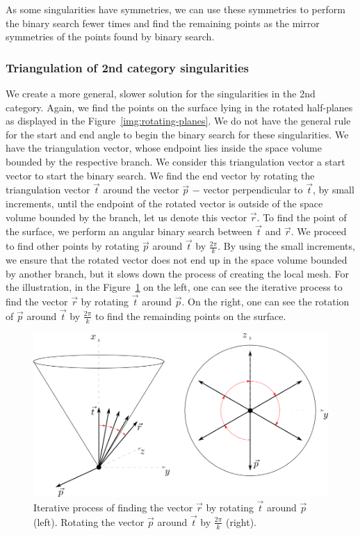 As some singularities have symmetries, we can use these symmetries
to perform the binary search fewer times and find the remaining points
as the mirror symmetries of the points found by binary search.

\subsubsection*{Triangulation of 2nd category singularities}
We create a more general, slower solution for the singularities in the 2nd category.
Again, we find the points on the surface lying in the rotated half-planes
as displayed in the Figure~\ref{img:rotating-planes}.
We do not have the general rule for the start 
and end angle to begin the binary search for these singularities. We have the triangulation vector,
whose endpoint lies inside the space volume bounded by the respective branch.
We consider this triangulation vector a start vector to start the binary 
search. We find the end vector by rotating the triangulation vector $\vec{t}$ 
around the vector $\vec{p}$ $-$ vector perpendicular to $\vec{t}$, by small increments, 
until the endpoint of the rotated vector is outside of the space volume bounded by the branch,
let us denote this vector $\vec{r}$.
To find the point of the surface, we perform an angular binary search between $\vec{t}$
and $\vec{r}$. We proceed to find other points by rotating $\vec{p}$
around $\vec{t}$ by $\frac{2\pi}{k}$.
By using the small increments, we ensure that the rotated vector does not end up in
the space volume bounded by another branch, but it slows down the process of creating
the local mesh.
For the illustration, in the Figure~\ref{img:54} on the left, one can see the iterative
process to find the vector $\vec{r}$ by rotating $\vec{t}$ around $\vec{p}$.
On the right, one can see the rotation of $\vec{p}$ around $\vec{t}$ by 
$\frac{2\pi}{k}$ to find the remainding points on the surface.

\begin{figure}
    \centerline{\includegraphics[scale=0.5]{images/img54}}
    \caption[Triangulation of 2nd category singularities]
    {Iterative process of finding the vector $\vec{r}$ 
    by rotating $\vec{t}$ around $\vec{p}$ (left).
    Rotating the vector $\vec{p}$ around $\vec{t}$ by 
    $\frac{2\pi}{k}$ (right).}
    \label{img:54}
\end{figure}

